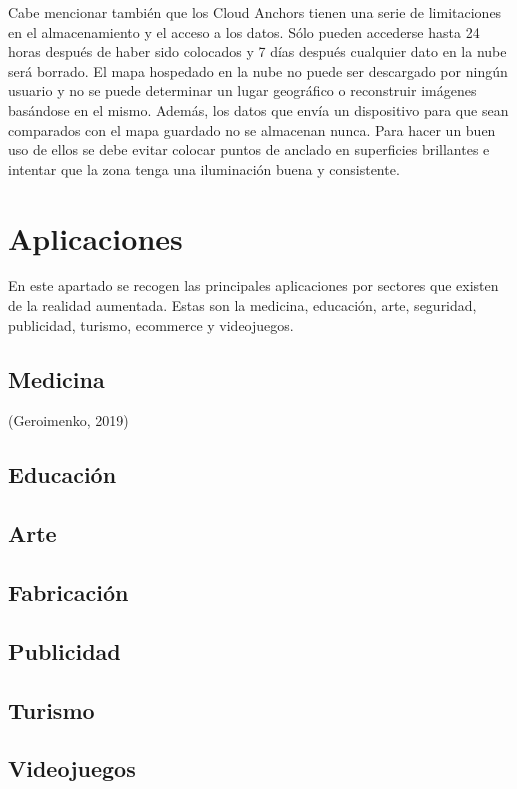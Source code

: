 Cabe mencionar también que los Cloud Anchors tienen una serie de limitaciones en el almacenamiento y el acceso a los datos. Sólo pueden accederse hasta 24 horas después de haber sido colocados y 7 días después cualquier dato en la nube será borrado. El mapa hospedado en la nube no puede ser descargado por ningún usuario y no se puede determinar un lugar geográfico o reconstruir imágenes basándose en el mismo. Además, los datos que envía un dispositivo para que sean comparados con el mapa guardado no se almacenan nunca.
Para hacer un buen uso de ellos se debe evitar colocar puntos de anclado en superficies brillantes e intentar que la zona tenga una iluminación buena y consistente.

\section{Aplicaciones}
En este apartado se recogen las principales aplicaciones por sectores que existen de la realidad aumentada. Estas son la medicina, educación, arte, seguridad, publicidad, turismo, ecommerce y videojuegos.
\subsection{Medicina}
(Geroimenko, 2019)
\subsection{Educación}
\subsection{Arte}
\subsection{Fabricación}
\subsection{Publicidad}
\subsection{Turismo}
\subsection{Videojuegos}
